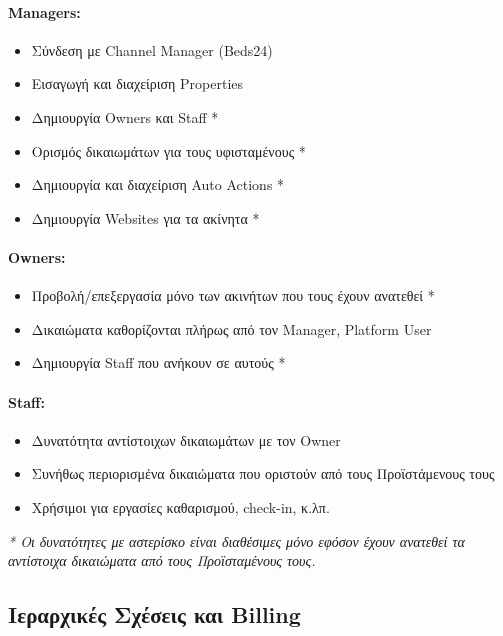 \documentclass[
	12pt, %
	oneside, %
	greek,
	onehalfspacing, %
	liststotoc, %
	toctotoc, %
	parskip, %
	headsepline, %
]{MastersDoctoralThesis} %
\begin{document}
\paragraph{Managers:}
\begin{itemize}
    \item Σύνδεση με Channel Manager (Beds24)
    \item Εισαγωγή και διαχείριση Properties
    \item Δημιουργία Owners και Staff *
    \item Ορισμός δικαιωμάτων για τους υφισταμένους *
    \item Δημιουργία και διαχείριση Auto Actions *
    \item Δημιουργία Websites για τα ακίνητα *
\end{itemize}

\paragraph{Owners:}
\begin{itemize}
    \item Προβολή/επεξεργασία μόνο των ακινήτων που τους έχουν ανατεθεί *
    \item Δικαιώματα καθορίζονται πλήρως από τον Manager, Platform User
    \item Δημιουργία Staff που ανήκουν σε αυτούς *
\end{itemize}

\paragraph{Staff:}
\begin{itemize}
    \item Δυνατότητα αντίστοιχων δικαιωμάτων με τον Owner
    \item Συνήθως περιορισμένα δικαιώματα που οριστούν από τους Προϊστάμενους τους
    \item Χρήσιμοι για εργασίες καθαρισμού, check-in, κ.λπ.
\end{itemize}

\noindent\textit{* Οι δυνατότητες με αστερίσκο είναι διαθέσιμες μόνο εφόσον έχουν ανατεθεί τα αντίστοιχα δικαιώματα από τους Προϊσταμένους τους.}

\subsection{Ιεραρχικές Σχέσεις και Billing}
\label{subsec:hierarchical-relations}
\end{document}

